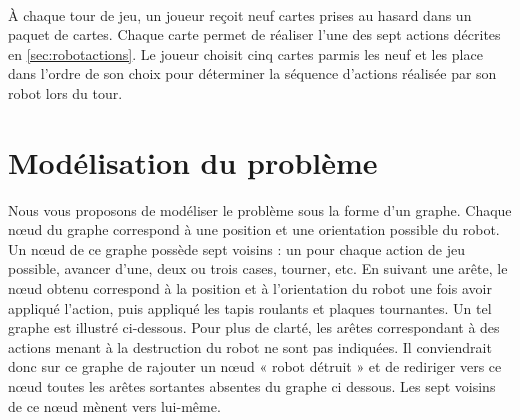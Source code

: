 \documentclass[a4paper]{article}
\begin{document}
\paragraph{}À chaque tour de jeu, un joueur reçoit neuf cartes prises au hasard
dans un paquet de cartes. Chaque carte permet de réaliser l'une des sept actions
décrites en \autoref{sec:robotactions}. Le joueur choisit cinq cartes parmis les
neuf et les place dans l'ordre de son choix pour déterminer la séquence
d'actions réalisée par son robot lors du tour.

\section{Modélisation du problème}

Nous vous proposons de modéliser le problème sous la forme d'un graphe. Chaque
nœud du graphe correspond à une position et une orientation possible du robot.
Un nœud de ce graphe possède sept voisins : un pour chaque action de jeu
possible, avancer d'une, deux ou trois cases, tourner, etc. En suivant une
arête, le nœud obtenu correspond à la position et à l'orientation du robot une
fois avoir appliqué l'action, puis appliqué les tapis roulants et plaques
tournantes. Un tel graphe est illustré ci-dessous. Pour plus de clarté, les
arêtes correspondant à des actions menant à la destruction du robot ne sont pas
indiquées. Il conviendrait donc sur ce graphe de rajouter un nœud « robot
détruit » et de rediriger vers ce nœud toutes les arêtes sortantes absentes du
graphe ci dessous. Les sept voisins de ce nœud mènent vers lui-même.

\newcommand{\fwdone}{$\mathbf{\overset{1}{\rightarrow}}$}
\newcommand{\fwdtwo}{$\mathbf{\overset{2}{\rightarrow}}$}
\newcommand{\fwdthree}{$\mathbf{\overset{3}{\rightarrow}}$}
\newcommand{\bwdone}{$\mathbf{\overset{1}{\leftarrow}}$}
\newcommand{\turnleft}{$\mathbf{\circlearrowleft}$}
\newcommand{\turnright}{$\mathbf{\circlearrowright}$}
\newcommand{\uturn}{$\mathbf{\rightleftarrows}$}
\end{document}
